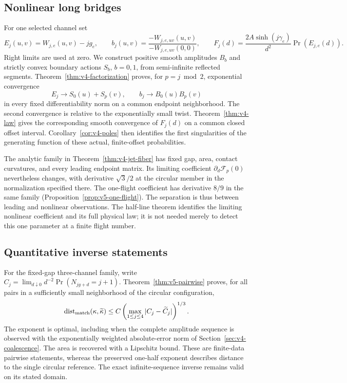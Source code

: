 \subsection{Nonlinear long bridges}
For one selected channel set
\[
 E_j(u,v)=W_{j,e}(u,v)-jg_e,\qquad
 b_j(u,v)=\frac{-W_{j,e,uv}(u,v)}{-W_{j,e,uv}(0,0)},\qquad
 F_j(d)=\frac{2A\sinh(j\gamma_e)}{d^2}\Pr(E_{j,e}(d)).
\]
Right limits are used at zero. We construct positive smooth amplitudes
$B_b$ and strictly convex boundary actions $S_b$, $b=0,1$, from
semi-infinite reflected segments. Theorem~\ref{thm:v4-factorization}
proves, for $p=j\bmod2$, exponential convergence
\[
 E_j\longrightarrow S_0(u)+S_p(v),\qquad
 b_j\longrightarrow B_0(u)B_p(v)
\]
in every fixed differentiability norm on a common endpoint neighborhood.
The second convergence is relative to the exponentially small twist.
Theorem~\ref{thm:v4-law} gives the corresponding smooth convergence of
$F_j(d)$ on a common closed offset interval. Corollary~\ref{cor:v4-poles}
then identifies the first singularities of the generating function of
these actual, finite-offset probabilities.

The analytic family in Theorem~\ref{thm:v4-jet-fiber} has fixed gap,
area, contact curvatures, and every leading endpoint matrix. Its limiting
coefficient $\partial_d\mathcal F_p(0)$ nevertheless changes, with derivative
$\sqrt3/2$ at the circular member in the normalization specified there.
The one-flight coefficient has derivative $8/9$ in the same family
(Proposition~\ref{prop:v5-one-flight}). The separation is thus between
leading and nonlinear observations. The half-line theorem identifies
the limiting nonlinear coefficient and its full physical law; it is not
needed merely to detect this one parameter at a finite flight number.

\subsection{Quantitative inverse statements}
For the fixed-gap three-channel family, write
$C_j=\lim_{d\downarrow0}d^{-2}\Pr(N_{jg+d}=j+1)$.
Theorem~\ref{thm:v5-pairwise} proves, for all pairs in a sufficiently
small neighborhood of the circular configuration,
\[
 \operatorname{dist}_{\rm match}(\kappa,\widetilde\kappa)
 \le C\left(\max_{1\le j\le4}|C_j-\widetilde C_j|\right)^{1/3}.
\]
The exponent is optimal, including when the complete amplitude sequence
is observed with the exponentially weighted absolute-error norm of
Section~\ref{sec:v4-coalescence}. The area is recovered with a Lipschitz
bound. These are finite-data pairwise statements, whereas the preserved
one-half exponent describes distance to the single circular reference.
The exact infinite-sequence inverse remains valid on its stated domain.

